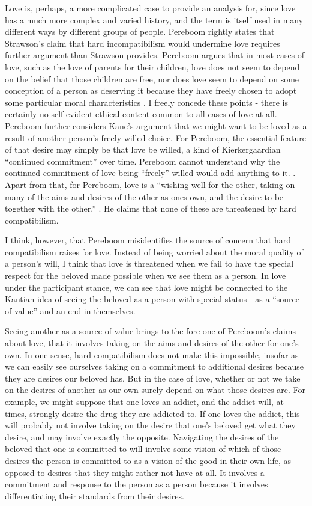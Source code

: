 \documentclass[phd,12pt,oneside,paper=letterpaper]{ubcthesis}
\begin{document}
Love is, perhaps, a more complicated case to provide an analysis for, since love has a much more complex and varied history, and the term is itself used in many different ways by different groups of people. Pereboom rightly states that Strawson's claim that hard incompatibilism would undermine love requires further argument than Strawson provides. Pereboom argues that in most cases of love, such as the love of parents for their children, love does not seem to depend on the belief that those children are free, nor does love seem to depend on some conception of a person as deserving it because they have freely chosen to adopt some particular moral characteristics \citep[p202]{pereboom2001}. I freely concede these points - there is certainly no self evident ethical content common to all cases of love at all. Pereboom further considers Kane's argument that we might want to be loved as a result of another person's freely willed choice. For Pereboom, the essential feature of that desire may simply be that love be willed, a kind of Kierkergaardian ``continued commitment'' over time. Pereboom cannot understand why the continued commitment of love being ``freely'' willed would add anything to it. \citep[p203-4]{pereboom2001}. Apart from that, for Pereboom, love is a ``wishing well for the other, taking on many of the aims and desires of the other as ones own, and the desire to be together with the other.'' \citep[p202]{pereboom2001}. He claims that none of these are threatened by hard compatibilism.

I think, however, that Pereboom misidentifies the source of concern that hard compatibilism raises for love.  Instead of being worried about the moral quality of a person's will, I think that love is threatened when we fail to have the special respect for the beloved made possible when we see them as a person. In love under the participant stance, we can see that love might be connected to the Kantian idea of seeing the beloved as a person with special status - as a ``source of value'' and an end in themselves. 

Seeing another as a source of value brings to the fore one of Pereboom's claims about love, that it involves taking on the aims and desires of the other for one's own. In one sense, hard compatibilism  does not make this impossible, insofar as we can easily see ourselves taking on a commitment to additional desires because they are desires our beloved has. But in the case of love, whether or not we take on the desires of another as our own surely depend on what those desires are. For example, we might suppose that one loves an addict, and the addict will, at times, strongly desire the drug they are addicted to. If one loves the addict, this will probably not involve taking on the desire that one's beloved get what they desire, and may involve exactly the opposite. Navigating the desires of the beloved that one is committed to will involve some vision of which of those desires the person is committed to as a vision of the good in their own life, as opposed to desires that they might rather not have at all. It involves a commitment and response to the person as a person because it involves differentiating their standards from their desires. 
\end{document}
